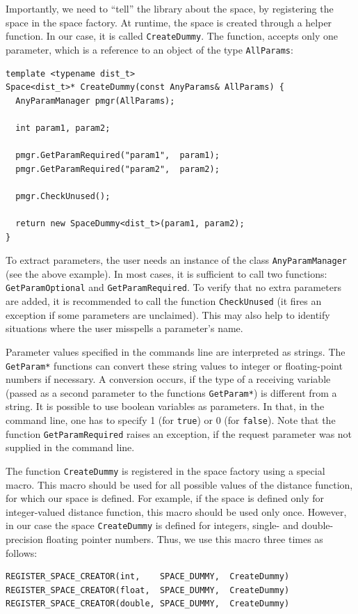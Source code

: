 \documentclass[runningheads,a4paper]{llncs}
\newcommand{\ttt}[1]{\texttt{#1}}
\begin{document}
Importantly, we need to ``tell'' the library about the space,
by registering the space in the space factory.
At runtime, the space is created through a helper function.
In our case, it is called \ttt{CreateDummy}.
The function, accepts only one parameter,
which is a reference to an object of the type \ttt{AllParams}:

\begin{verbatim}
template <typename dist_t>
Space<dist_t>* CreateDummy(const AnyParams& AllParams) {
  AnyParamManager pmgr(AllParams);

  int param1, param2;

  pmgr.GetParamRequired("param1",  param1);
  pmgr.GetParamRequired("param2",  param2);

  pmgr.CheckUnused();

  return new SpaceDummy<dist_t>(param1, param2);
}
\end{verbatim}
To extract parameters, the user needs an instance of the class \ttt{AnyParamManager} (see the above example).
In most cases, it is sufficient to call two functions: \ttt{GetParamOptional} and
\ttt{GetParamRequired}.
To verify that no extra parameters are added, it is recommended to call the function \ttt{CheckUnused}
(it fires an exception if some parameters are unclaimed).
This may also help to identify situations where the user misspells 
a parameter's name.


Parameter values specified in the commands line are interpreted as strings.
The \ttt{GetParam*} functions can convert these string values
to integer or floating-point numbers if necessary.
A conversion occurs, if the type of a receiving variable (passed as a second parameter
to the functions \ttt{GetParam*}) is different from a string.
It is possible to use boolean variables as parameters.
In that, in the command line, one has to specify 1 (for \ttt{true}) or 0 (for \ttt{false}).
Note that the function \ttt{GetParamRequired} raises an exception, 
if the request parameter was not supplied in the command line.

The function \ttt{CreateDummy} is registered in the space factory using a special macro.
This macro should be used for all possible values of the distance function,
for which our space is defined. For example, if the space is defined
only for integer-valued distance function, this macro should be used only once.
However, in our case the space \ttt{CreateDummy} is defined for integers,
single- and double-precision floating pointer numbers. Thus, we use this macro
three times as follows:
\begin{verbatim}
REGISTER_SPACE_CREATOR(int,    SPACE_DUMMY,  CreateDummy)
REGISTER_SPACE_CREATOR(float,  SPACE_DUMMY,  CreateDummy)
REGISTER_SPACE_CREATOR(double, SPACE_DUMMY,  CreateDummy)
\end{verbatim}
\end{document}

